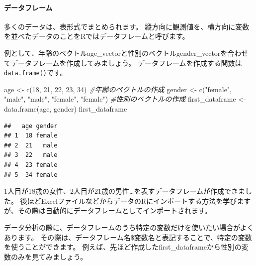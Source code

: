 \documentclass[
]{book}
\newenvironment{Shaded}{\begin{snugshade}}{\end{snugshade}}
\newcommand{\CommentTok}[1]{\textcolor[rgb]{0.56,0.35,0.01}{\textit{#1}}}
\newcommand{\DecValTok}[1]{\textcolor[rgb]{0.00,0.00,0.81}{#1}}
\newcommand{\FunctionTok}[1]{\textcolor[rgb]{0.00,0.00,0.00}{#1}}
\newcommand{\NormalTok}[1]{#1}
\newcommand{\OtherTok}[1]{\textcolor[rgb]{0.56,0.35,0.01}{#1}}
\newcommand{\SpecialCharTok}[1]{\textcolor[rgb]{0.00,0.00,0.00}{#1}}
\newcommand{\StringTok}[1]{\textcolor[rgb]{0.31,0.60,0.02}{#1}}
\begin{document}
\hypertarget{ux30c7ux30fcux30bfux30d5ux30ecux30fcux30e0}{%
\paragraph*{データフレーム}\label{ux30c7ux30fcux30bfux30d5ux30ecux30fcux30e0}}

多くのデータは、表形式でまとめられます。 縦方向に観測値を、横方向に変数を並べたデータのことをRではデータフレームと呼びます。

例として、年齢のベクトルage\_vectorと性別のベクトルgender\_vectorを合わせてデータフレームを作成してみましょう。 データフレームを作成する関数は\texttt{data.frame()}です。

\begin{Shaded}
\begin{Highlighting}[]
\NormalTok{age }\OtherTok{\textless{}{-}} \FunctionTok{c}\NormalTok{(}\DecValTok{18}\NormalTok{, }\DecValTok{21}\NormalTok{, }\DecValTok{22}\NormalTok{, }\DecValTok{23}\NormalTok{, }\DecValTok{34}\NormalTok{) }\CommentTok{\#年齢のベクトルの作成}
\NormalTok{gender }\OtherTok{\textless{}{-}} \FunctionTok{c}\NormalTok{(}\StringTok{"female"}\NormalTok{, }\StringTok{"male"}\NormalTok{, }\StringTok{"male"}\NormalTok{, }\StringTok{"female"}\NormalTok{, }\StringTok{"female"}\NormalTok{) }\CommentTok{\#性別のベクトルの作成}
\NormalTok{first\_dataframe }\OtherTok{\textless{}{-}} \FunctionTok{data.frame}\NormalTok{(age, gender)}
\NormalTok{first\_dataframe}
\end{Highlighting}
\end{Shaded}

\begin{verbatim}
##   age gender
## 1  18 female
## 2  21   male
## 3  22   male
## 4  23 female
## 5  34 female
\end{verbatim}

1人目が18歳の女性、2人目が21歳の男性\ldots を表すデータフレームが作成できました。 後ほどExcelファイルなどからデータのRにインポートする方法を学びますが、その際は自動的にデータフレームとしてインポートされます。

データ分析の際に、データフレームのうち特定の変数だけを使いたい場合がよくあります。 その際は、データフレーム名\$変数名と表記することで、特定の変数を使うことができます。 例えば、先ほど作成したfirst\_dataframeから性別の変数のみを見てみましょう。

\begin{Shaded}
\end{Shaded}
\end{document}
